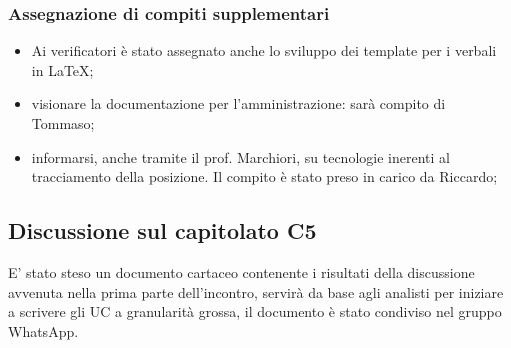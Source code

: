 \subsubsection{Assegnazione di compiti supplementari}
\begin{itemize}
\item Ai verificatori è stato assegnato anche lo sviluppo dei template per i verbali in \LaTeX;
\item visionare la documentazione per l'amministrazione: sarà compito di Tommaso;
\item informarsi, anche tramite il prof. Marchiori, su tecnologie inerenti al tracciamento della posizione. Il compito è stato preso in carico da Riccardo;
\end{itemize}
\subsection{Discussione sul capitolato C5}
E' stato steso un documento cartaceo contenente i risultati della discussione avvenuta nella prima parte dell'incontro, servirà da base agli analisti per iniziare a scrivere gli UC a granularità grossa, il documento è stato condiviso nel gruppo WhatsApp.
\clearpage